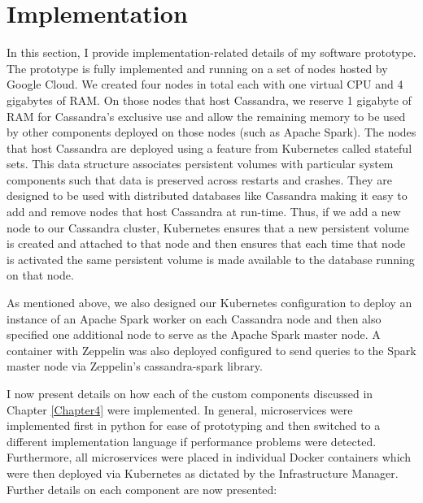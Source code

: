 
\chapter{Implementation} %

\label{Chapter5} %

In this section, I provide implementation-related details of my software prototype. The prototype is fully implemented and running on a set of nodes hosted by Google Cloud. We created four nodes in total each with one virtual CPU and 4 gigabytes of RAM. On those nodes that host Cassandra, we reserve 1 gigabyte of RAM for Cassandra’s exclusive use and allow the remaining memory to be used by other components deployed on those nodes (such as Apache Spark). The nodes that host Cassandra are deployed using a feature from Kubernetes called stateful sets. This data structure associates persistent volumes with particular system components such that data is preserved across restarts and crashes. They are designed to be used with distributed databases like Cassandra making it easy to add and remove nodes that host Cassandra at run-time. Thus, if we add a new node to our Cassandra cluster, Kubernetes ensures that a new persistent volume is created and attached to that node and then ensures that each time that node is activated the same persistent volume is made available to the database running on that node.

As mentioned above, we also designed our Kubernetes configuration to deploy an instance of an Apache Spark worker on each Cassandra node and then also specified one additional node to serve as the Apache Spark master node. A container with Zeppelin was also deployed configured to send queries to the Spark master node via Zeppelin’s cassandra-spark library.

I now present details on how each of the custom components discussed in Chapter \ref{Chapter4} were implemented. In general, microservices were implemented first in python for ease of prototyping and then switched to a different implementation language if performance problems were detected. Furthermore, all microservices were placed in individual Docker containers which were then deployed via Kubernetes as dictated by the Infrastructure Manager. Further details on each component are now presented:



